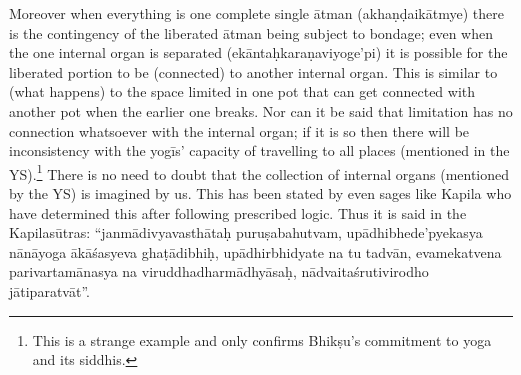 




Moreover when everything is one complete single ātman (akhaṇḍaikātmye) there is the contingency of the liberated ātman being subject to bondage; even when the one internal organ is separated (ekāntaḥkara\-ṇaviyoge’pi) it is possible for the liberated portion to be (connected) to another internal organ. This is similar to (what happens) to the space limited in one pot that can get connected with another pot when the earlier one breaks. Nor can it be said that limitation has no connection whatsoever with the internal organ; if it is so then there will be inconsistency with the yogīs’ capacity of travelling to all places (mentioned in the YS).\footnote{This is a strange example and only confirms Bhikṣu’s commitment to yoga and its siddhis.} There is no need to doubt that the collection of internal organs (mentioned by the YS)  is imagined by us. This has been stated by even sages like Kapila who have determined this after following prescribed logic. Thus it is said in the Kapilasūtras: “janmādivyavasthātaḥ puruṣabahutvam, upādhibhede’pyekasya nānāyoga ākāśasyeva ghaṭā\-dibhiḥ, upādhirbhidyate na tu tadvān, evamekatvena parivartamānasya na viruddhadharmādhyāsaḥ, nādvaitaśrutivirodho jātiparatvāt”. 

